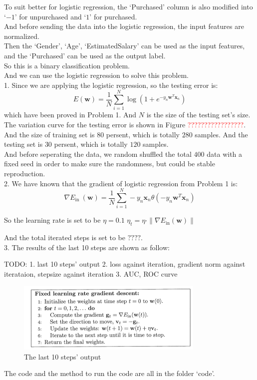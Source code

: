 To suit better for logistic regression, the `Purchased' column is also modified into `$-1$' for unpurchased and `$1$' for purchased.\\
And before sending the data into the logistic regression, the input features are normalized.\\

Then the `Gender', `Age', `EstimatedSalary' can be used as the input features, and the `Purchased' can be used as the output label.\\
So this is a binary classification problem.\\
And we can use the logistic regression to solve this problem.\\

1. Since we are applying the logistic regression, so the testing error is:
$$E(\mathbf{w}) = \dfrac{1}{N}\sum_{i=1}^{N}\log (1+e^{-y_n\mathbf{w}^T\mathbf{x}_n})$$
which have been proved in Problem 1. And $N$ is the size of the testing set's size.\\
The variation curve for the testing error is shown in Figure \textcolor{red}{?????????????????}.\\


And the size of training set is $80$ persent, which is totally $280$ samples. And the testing set is $30$ persent, which is totally $120$ samples.\\
And before seperating the data, we random shuffled the total $400$ data with a fixed seed in order to make sure the randomness, but could be stable reproduction.\\

2. We have known that the gradient of logistic regression from Problem 1 is:
$$\nabla E_{\text {in }}(\mathbf{w}) = \dfrac{1}{N}\sum_{i=1}^{N}-y_n\mathbf{x}_n\theta(-y_n\mathbf{w}^T\mathbf{x}_n)$$

So the learning rate is set to be
$\eta = 0.1$
$\eta_t = \eta\cdot \|\nabla E_{\text{in}}(\mathbf{w})\|$

And the total iterated steps is set to be $????$.\\


3. The results of the last 10 steps are shown as follow:



TODO:
1. last 10 steps' output
2. loss against iteration, gradient norm against iterataion, stepsize against iteration
3. AUC, ROC curve












\begin{figure}[htbp]
  \centerline{\includegraphics[width=0.8\textwidth]{./image/alg.png}}
  \caption{The last 10 steps' output}  
\end{figure}

The code and the method to run the code are all in the folder `code'.